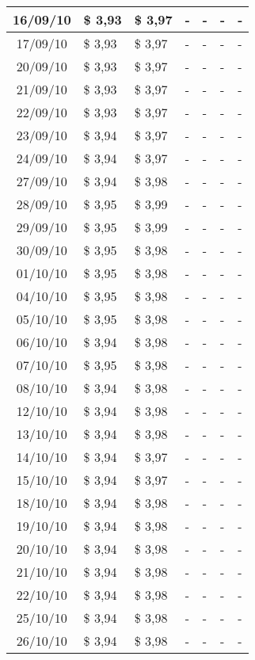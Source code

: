\begin{center}
\begin{longtable}{|c|p{1.5cm}|p{1.5cm}|p{1.5cm}|p{1.5cm}|p{1.5cm}|p{1.5cm}|}
16/09/10 & \$ 3,93 & \$ 3,97 & - & - & - & - \\ \hline
17/09/10 & \$ 3,93 & \$ 3,97 & - & - & - & - \\ \hline
20/09/10 & \$ 3,93 & \$ 3,97 & - & - & - & - \\ \hline
21/09/10 & \$ 3,93 & \$ 3,97 & - & - & - & - \\ \hline
22/09/10 & \$ 3,93 & \$ 3,97 & - & - & - & - \\ \hline
23/09/10 & \$ 3,94 & \$ 3,97 & - & - & - & - \\ \hline
24/09/10 & \$ 3,94 & \$ 3,97 & - & - & - & - \\ \hline
27/09/10 & \$ 3,94 & \$ 3,98 & - & - & - & - \\ \hline
28/09/10 & \$ 3,95 & \$ 3,99 & - & - & - & - \\ \hline
29/09/10 & \$ 3,95 & \$ 3,99 & - & - & - & - \\ \hline
30/09/10 & \$ 3,95 & \$ 3,98 & - & - & - & - \\ \hline
01/10/10 & \$ 3,95 & \$ 3,98 & - & - & - & - \\ \hline
04/10/10 & \$ 3,95 & \$ 3,98 & - & - & - & - \\ \hline
05/10/10 & \$ 3,95 & \$ 3,98 & - & - & - & - \\ \hline
06/10/10 & \$ 3,94 & \$ 3,98 & - & - & - & - \\ \hline
07/10/10 & \$ 3,95 & \$ 3,98 & - & - & - & - \\ \hline
08/10/10 & \$ 3,94 & \$ 3,98 & - & - & - & - \\ \hline
12/10/10 & \$ 3,94 & \$ 3,98 & - & - & - & - \\ \hline
13/10/10 & \$ 3,94 & \$ 3,98 & - & - & - & - \\ \hline
14/10/10 & \$ 3,94 & \$ 3,97 & - & - & - & - \\ \hline
15/10/10 & \$ 3,94 & \$ 3,97 & - & - & - & - \\ \hline
18/10/10 & \$ 3,94 & \$ 3,98 & - & - & - & - \\ \hline
19/10/10 & \$ 3,94 & \$ 3,98 & - & - & - & - \\ \hline
20/10/10 & \$ 3,94 & \$ 3,98 & - & - & - & - \\ \hline
21/10/10 & \$ 3,94 & \$ 3,98 & - & - & - & - \\ \hline
22/10/10 & \$ 3,94 & \$ 3,98 & - & - & - & - \\ \hline
25/10/10 & \$ 3,94 & \$ 3,98 & - & - & - & - \\ \hline
26/10/10 & \$ 3,94 & \$ 3,98 & - & - & - & - \\ \hline

\end{longtable}
\end{center}
